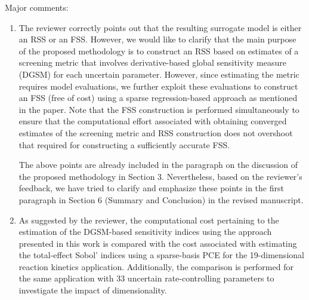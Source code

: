 \documentclass[11pt,final]{article}
\newcommand{\referee}[1]{\vspace{.1ex}\noindent{\textcolor{blue}{#1}}}
\begin{document}
Major comments:
\begin{enumerate}

\item
\referee{
In this paper, the constructed surrogate model is either a RSS or a FSS. Based
on the diagram on page 12, the resulting RSS is built upon the not sufficiently
accurate FSS model (which could lead the accuracy to decrease further), or
is the RSS constructed directly from the original model with reduced input
parameters? The diagram is ambigous on this issue.}

The reviewer correctly points out that the resulting surrogate model is either an RSS or
an FSS. However, we would like to clarify that the main purpose of the proposed
methodology is to construct an RSS based on estimates of a screening metric that
involves derivative-based global sensitivity measure (DGSM) for each uncertain parameter.
However, since estimating the metric requires model evaluations, we further exploit these
evaluations to construct an FSS (free of cost) using a sparse regression-based approach
as mentioned in the paper. Note that the FSS construction is performed simultaneously to 
ensure that the computational effort associated with obtaining converged estimates of
the screening metric and RSS construction does not overshoot that required for
constructing a sufficiently accurate FSS. 

The above points are already included in the paragraph on the discussion of the proposed
methodology in Section 3. Nevertheless, based on the reviewer's feedback, we have tried to
clarify and emphasize these points in the first paragraph in Section 6 (Summary and Conclusion)
in the revised manuscript. 

\item
\referee{The reviewer would also like to see the comparison of the computational cost
(not just the numerical results) of DGSMs to variance based sensitivity indices
with increasing parameter dimension, e.g. Sobol’ indices incorporated with
sparse grid, since the difference decreases with increasing number of parameters.}

As suggested by the reviewer, the computational cost pertaining to the estimation of the DGSM-based
sensitivity indices using the approach presented in this work is compared with the cost associated 
with estimating the total-effect Sobol' indices using a sparse-basis PCE
for the 19-dimensional reaction kinetics application. Additionally, the comparison is 
performed for the same application with 33 uncertain rate-controlling parameters to investigate
the impact of dimensionality. 


\end{enumerate}
\end{document}
